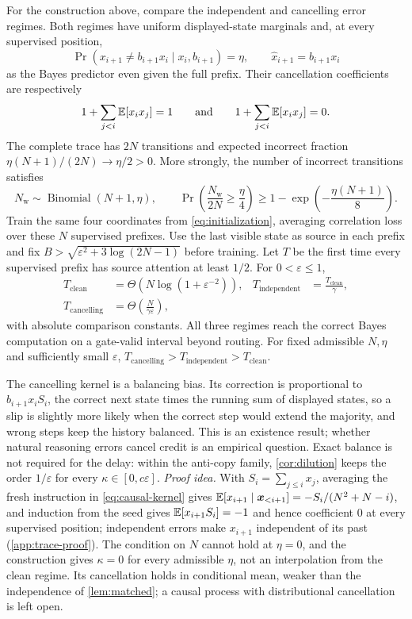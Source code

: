 \begin{mainresult}\begin{theorem}
\label{thm:causal}
For the construction above, compare the independent and cancelling error regimes.
Both regimes have uniform displayed-state marginals and, at every supervised position,
\[
 \Pr(x_{i+1}\ne b_{i+1}x_i\mid x_i,b_{i+1})=\eta,
 \qquad \hat x_{i+1}=b_{i+1}x_i
\]
as the Bayes predictor even given the full prefix.
Their cancellation coefficients are respectively
\[
 1+\sum_{j<i}\mathbb E[x_i x_j]=1\qquad\text{and}\qquad
 1+\sum_{j<i}\mathbb E[x_i x_j]=0.
\]
The complete trace has $2N$ transitions and expected incorrect fraction
$\eta(N+1)/(2N)\to\eta/2>0$.
More strongly, the number of incorrect transitions satisfies
\[
 N_{\mathrm w}\sim\operatorname{Binomial}(N+1,\eta),\qquad
 \Pr\!\left(\frac{N_{\mathrm w}}{2N}\ge\frac{\eta}{4}\right)
 \ge1-\exp\!\left(-\frac{\eta(N+1)}{8}\right).
\]
Train the same four coordinates from \cref{eq:initialization}, averaging correlation loss over these $N$ supervised prefixes.
Use the last visible state as source in each prefix and fix $B>\sqrt{\varepsilon^2+3\log(2N-1)}$ before training.
Let $T$ be the first time every supervised prefix has source attention at least $1/2$.
For $0<\varepsilon\le1$,
\begin{align*}
 T_{\mathrm{clean}}&=\Theta(N\log(1+\varepsilon^{-2})),&
 T_{\mathrm{independent}}&=\frac{T_{\mathrm{clean}}}{\gamma},\\
 T_{\mathrm{cancelling}}&=\Theta\!\left(\frac{N}{\gamma\varepsilon}\right),
\end{align*}
with absolute comparison constants. All three regimes reach the correct Bayes computation on a gate-valid interval beyond routing.
For fixed admissible $N,\eta$ and sufficiently small $\varepsilon$, $T_{\mathrm{cancelling}}>T_{\mathrm{independent}}>T_{\mathrm{clean}}$.
\end{theorem}\end{mainresult}
The cancelling kernel is a balancing bias. Its correction is proportional to $b_{i+1}x_i S_i$, the correct next state times the running sum of
displayed states, so a slip is slightly more likely when the correct step would extend the majority, and wrong steps keep the history balanced.
This is an existence result; whether natural reasoning errors cancel credit is an empirical question.
Exact balance is not required for the delay: within the anti-copy family, \cref{cor:dilution} keeps the order $1/\varepsilon$ for every
$\kappa\in[0,c\varepsilon]$.
\emph{Proof idea.} With $S_i=\sum_{j\le i}x_j$, averaging the fresh instruction in \cref{eq:causal-kernel} gives $\mathbb E[x_{i+1}\mid\bm x_{<i+1}]=-S_i/(N^2+N-i)$,
and induction from the seed gives $\mathbb E[x_{i+1}S_i]=-1$ and hence coefficient $0$ at every supervised position; independent errors make $x_{i+1}$ independent of its past (\cref{app:trace-proof}).
The condition on $N$ cannot hold at $\eta=0$, and the construction gives $\kappa=0$ for every admissible $\eta$, not an interpolation from the clean regime.
Its cancellation holds in conditional mean, weaker than the independence of \cref{lem:matched}; a causal process with distributional cancellation is left open.

